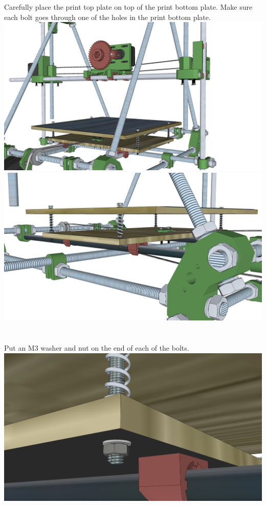 \documentclass[twoside,openany,a4paper,titlepage]{memoir}
\begin{document}
	\section{}
	Carefully place the print top plate on top of the print bottom plate. Make sure each bolt goes through
	one of the holes in the print bottom plate.\\
	\includegraphics[width=1\linewidth]{graphics/ch11_6_1.png}
	\includegraphics[width=1\linewidth]{graphics/ch11_6_2.png}
	
	\section{}
	Put an M3 washer and nut on the end of each of the bolts.\\
	\includegraphics[width=1\linewidth]{graphics/ch11_7.png}
	
\end{document}
